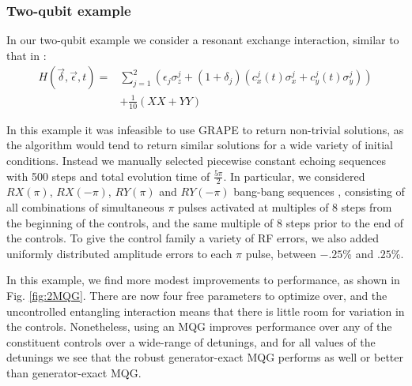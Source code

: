 \documentclass[aps,nofootinbib,pra,notitlepage,twocolumn]{revtex4-1}
\newcommand{\0}{\ensuremath{\mathbf{0}}}
\begin{document}
{\subsubsection{Two-qubit example} 
\label{sub:two_qubit}
In our two-qubit example we consider a resonant exchange interaction, similar to that in \cite{McKay2016}:
\begin{equation} \label{eq:2Qham}
\begin{split}
H(\vec{\delta}, \vec{\epsilon}, t) = &\sum_{j=1}^2(\epsilon_j\sigma_z^j + (1 + \delta_j)(c_x^j(t)\sigma_x^j + c_y^j(t)\sigma_y^j)) \\
&+ \frac{1}{10}(XX + YY)
\end{split}
\end{equation}

In this example it was infeasible to use GRAPE to return non-trivial solutions, as the algorithm would tend to return similar solutions for a wide variety of initial conditions. Instead we manually selected piecewise constant echoing sequences with 500 steps and total evolution time of $\frac{5\pi}{2}$. In particular, we considered $RX(\pi)$, $RX(-\pi)$, $RY(\pi)$ and $RY(-\pi)$ bang-bang sequences \cite{bangbang}, consisting of all combinations of simultaneous $\pi$ pulses activated at multiples of $8$ steps from the beginning of the controls, and the same multiple of $8$ steps prior to the end of the controls. To give the control family a variety of RF errors, we also added uniformly distributed amplitude errors to each $\pi$ pulse, between $-.25$\% and $.25$\%.

In this example, we find more modest improvements to performance, as shown in Fig. \ref{fig:2MQG}. There are now four free parameters to optimize over, and the uncontrolled entangling interaction means that there is little room for variation in the controls. Nonetheless, using an MQG improves performance over any of the constituent controls over a wide-range of detunings, and for all values of the detunings we see that the robust generator-exact MQG performs as well or better than generator-exact MQG.

}
\end{document}
